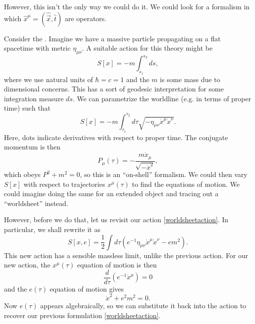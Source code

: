 However, this isn't the only way we could do it. We could look for a formalism in which $\hat x^\mu=(\hat{\vec x},\hat t)$ are operators.
\begin{exm}
    Consider the . Imagine we have a massive particle propagating on a flat spacetime with metric $\eta_{\mu\nu}$. A suitable action for this theory might be
    \begin{equation}
        S[x]=- m\int_{s_1}^{s_2}ds,
    \end{equation}
    where we use natural units of $\hbar = c=1$ and the $m$ is some mass due to dimensional concerns. This has a sort of geodesic interpretation for some integration measure $ds$. We can parametrize the worldline (e.g. in terms of proper time) such that
    \begin{equation}\label{worldsheetaction}
        S[x]=-m \int_{\tau_1}^{\tau_2} d\tau\sqrt{-\eta_{\mu\nu}\dot x^\mu \dot x^\nu}.
    \end{equation}
    Here, dots indicate derivatives with respect to proper time. The conjugate momentum is then
    \begin{equation}
        P_\mu (\tau)= -\frac{m\dot x_\mu}{\sqrt{-\dot x^2}},
    \end{equation}
    which obeys $P^2+m^2=0$, so this is an ``on-shell'' formalism. We could then vary $S[x]$ with respect to trajectories $x^\mu(\tau)$ to find the equations of motion. We could imagine doing the same for an extended object and tracing out a ``worldsheet'' instead.
    
    However, before we do that, let us revisit our action \ref{worldsheetaction}. In particular, we shall rewrite it as
    \begin{equation}
        S[x,e]=\frac{1}{2}\int d\tau \left(e^{-1} \eta_{\mu\nu} \dot x^\mu \dot x^\nu-e m^2\right).
    \end{equation}
    This new action has a sensible massless limit, unlike the previous action. For our new action, the $x^\mu(\tau)$ equation of motion is then
    \begin{equation*}
        \frac{d}{d\tau}(e^{-1}\dot x^\mu)=0
    \end{equation*}
    and the $e(\tau)$ equation of motion gives
    \begin{equation*}
        \dot x^2 + e^2m^2=0.
    \end{equation*}
    Now $e(\tau)$ appears algebraically, so we can substitute it back into the action to recover our previous formulation \ref{worldsheetaction}.
    

\end{exm}
